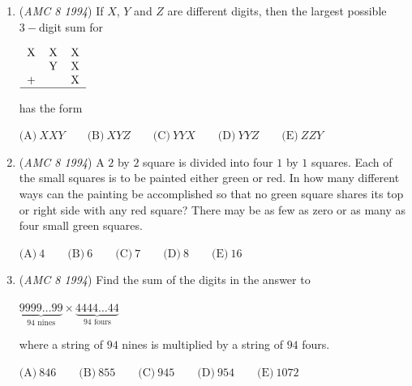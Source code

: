 \begin{enumerate}
$\text{(A)}\ \dfrac{1}{6} \qquad \text{(B)}\ \dfrac{1}{4} \qquad \text{(C)}\ \dfrac{1}{3} \qquad \text{(D)}\ \dfrac{5}{12} \qquad \text{(E)}\ \dfrac{4}{9}$


	\item (\textit{AMC 8 1994}) If $X$, $Y$ and $Z$ are different digits, then the largest possible $3-$digit sum for


 
$\begin{tabular}{ccc} X & X & X \\  & Y & X \\ + & & X \\ \hline \end{tabular}$


 


 has the form


 $\text{(A)}\ XXY \qquad \text{(B)}\ XYZ \qquad \text{(C)}\ YYX \qquad \text{(D)}\ YYZ \qquad \text{(E)}\ ZZY$


	\item (\textit{AMC 8 1994}) A $2$ by $2$ square is divided into four $1$ by $1$ squares.  Each of the small squares is to be painted either green or red.  In how many different ways can the painting be accomplished so that no green square shares its top or right side with any red square?  There may be as few as zero or as many as four small green squares.


 $\text{(A)}\  4 \qquad \text{(B)}\ 6 \qquad \text{(C)}\ 7 \qquad \text{(D)}\ 8 \qquad \text{(E)}\ 16$


	\item (\textit{AMC 8 1994}) Find the sum of the digits in the answer to


 
$\underbrace{9999\ldots 99}_{94\text{ nines}} \times \underbrace{4444\ldots 44}_{94\text{ fours}}$


 


 where a string of $94$ nines is multiplied by a string of $94$ fours.


 $\text{(A)}\ 846 \qquad \text{(B)}\ 855 \qquad \text{(C)}\ 945 \qquad \text{(D)}\ 954 \qquad \text{(E)}\ 1072$


\end{enumerate}